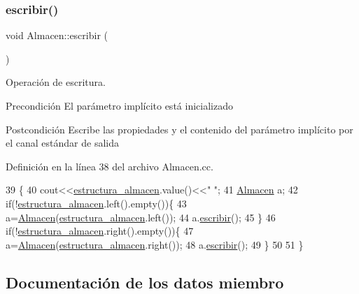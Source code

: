 \subsubsection{\texorpdfstring{escribir()}{escribir()}}
{\footnotesize\ttfamily void Almacen\+::escribir (\begin{DoxyParamCaption}{ }\end{DoxyParamCaption})}



Operación de escritura. 

\begin{DoxyPrecond}{Precondición}
El parámetro implícito está inicializado 
\end{DoxyPrecond}
\begin{DoxyPostcond}{Postcondición}
Escribe las propiedades y el contenido del parámetro implícito por el canal estándar de salida 
\end{DoxyPostcond}


Definición en la línea 38 del archivo Almacen.\+cc.


\begin{DoxyCode}
39 \{   
40     cout<<\hyperlink{class_almacen_a0744bed3ca8c796990c939bbf7fc03b9}{estructura\_almacen}.value()<<\textcolor{stringliteral}{" "};
41     \hyperlink{class_almacen}{Almacen} a;
42     \textcolor{keywordflow}{if}(!\hyperlink{class_almacen_a0744bed3ca8c796990c939bbf7fc03b9}{estructura\_almacen}.left().empty())\{
43         a=\hyperlink{class_almacen_a68a6084d5775d391c52d4825072a0612}{Almacen}(\hyperlink{class_almacen_a0744bed3ca8c796990c939bbf7fc03b9}{estructura\_almacen}.left());
44         a.\hyperlink{class_almacen_a0757bdd016511f5b2b1019060c0b2a9c}{escribir}();
45     \}
46     \textcolor{keywordflow}{if}(!\hyperlink{class_almacen_a0744bed3ca8c796990c939bbf7fc03b9}{estructura\_almacen}.right().empty())\{
47         a=\hyperlink{class_almacen_a68a6084d5775d391c52d4825072a0612}{Almacen}(\hyperlink{class_almacen_a0744bed3ca8c796990c939bbf7fc03b9}{estructura\_almacen}.right());
48         a.\hyperlink{class_almacen_a0757bdd016511f5b2b1019060c0b2a9c}{escribir}();
49     \}
50 
51 \}
\end{DoxyCode}


\subsection{Documentación de los datos miembro}
\mbox{\label{class_almacen_a0744bed3ca8c796990c939bbf7fc03b9}} 
